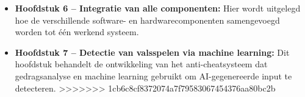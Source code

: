 \begin{itemize}
    \item \textbf{Hoofdstuk 6 – Integratie van alle componenten:} Hier wordt uitgelegd hoe de verschillende software- en hardwarecomponenten samengevoegd worden tot één werkend systeem.
    
    \item \textbf{Hoofdstuk 7 – Detectie van valsspelen via machine learning:} Dit hoofdstuk behandelt de ontwikkeling van het anti-cheatsysteem dat gedragsanalyse en machine learning gebruikt om AI-gegenereerde input te detecteren.
>>>>>>> 1cb6c8cf8372074a7f79583067454376aa80bc2b
\end{itemize}

